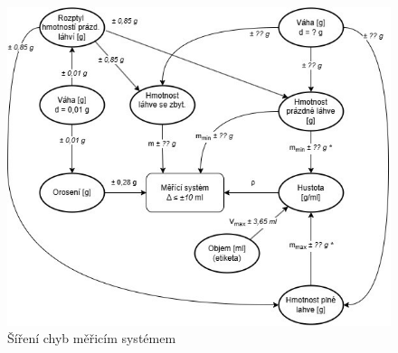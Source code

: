 


\begin{figure}[H]
    \begin{center}
        \includegraphics[scale=0.9]{obrazky/Propagace nejistot-Metoda1++.jpg}
    \end{center}
    \caption{Šíření chyb měřicím systémem}
    \label{chyby}
\end{figure}

